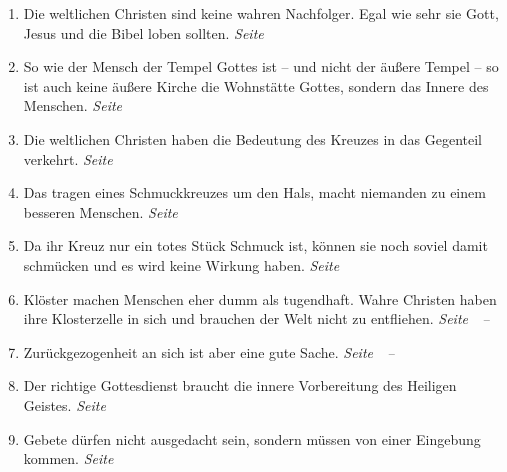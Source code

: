 \begin{enumerate}
 \item Die weltlichen Christen sind keine wahren Nachfolger. Egal wie sehr sie
Gott, Jesus und die Bibel loben sollten.
 \dotfill \textit{Seite~\pageref{ref:05_05_wahre_nachfolge}}\\

 \item So wie der Mensch der Tempel Gottes ist -- und nicht der äußere Tempel
--
 so ist auch keine äußere Kirche die Wohnstätte Gottes, sondern das Innere des
Menschen.
 \dotfill \textit{Seite~\pageref{ref:05_06_tempel}}\\

 \item Die weltlichen Christen haben die Bedeutung des Kreuzes in das Gegenteil
verkehrt.
 \dotfill \textit{Seite~\pageref{ref:05_07_kreuz}}\\

 \item Das tragen eines Schmuckkreuzes um den Hals, macht niemanden zu einem
besseren Menschen.
 \dotfill \textit{Seite~\pageref{ref:05_08_kreuz}}\\

 \item Da ihr Kreuz nur ein totes Stück Schmuck ist, können sie noch soviel
damit schmücken und es wird keine Wirkung haben.
 \dotfill \textit{Seite~\pageref{ref:05_09_kreuz}}\\

 \item Klöster machen Menschen eher dumm als tugendhaft. Wahre Christen haben ihre
Klosterzelle in sich und brauchen der Welt nicht zu entfliehen.
 \dotfill \textit{Seite~\pageref{ref:05_11_kloster}~--~\pageref{ref:05_11_kloster_ende}}\\

 \item Zurückgezogenheit an sich ist aber eine gute Sache.
 \dotfill \textit{Seite~\pageref{ref:05_13_zurueckgezogenheit}~--~\pageref{ref:05_13_zurueckgezogenheit_ende}}\\

 \item Der richtige Gottesdienst braucht die innere Vorbereitung des Heiligen
Geistes.
 \dotfill \textit{Seite
\pageref{ref:06_03_gottesdiensvorbereitung}}\\

 \item Gebete dürfen nicht ausgedacht sein, sondern müssen von einer Eingebung
kommen.
 \dotfill \textit{Seite~\pageref{ref:06_04_gebet}}\\


\end{enumerate}

